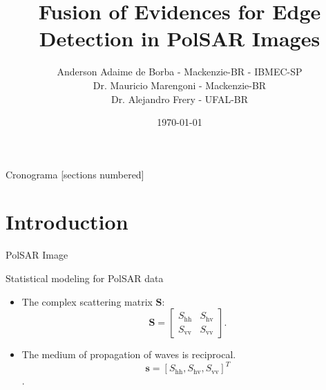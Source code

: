 \documentclass[10pt]{beamer}
\title{Fusion of Evidences for Edge Detection in PolSAR Images}
\date{\today}
\author{Anderson Adaime de Borba - Mackenzie-BR - IBMEC-SP\\
        Dr. Mauricio Marengoni - Mackenzie-BR\\
        Dr. Alejandro Frery - UFAL-BR}
\institute{TENGRSS - 2019}
\begin{document}
\maketitle

\begin{frame}{Cronograma}
  [sections numbered]
  \tableofcontents[hideallsubsections]
\end{frame}

\section{Introduction}

\begin{frame}[fragile]{PolSAR Image}
\begin{alertblock}{Statistical modeling for PolSAR data}
\begin{itemize}
\item The complex scattering matrix $\mathbf{S}$:
\begin{equation}
\mathbf{S} = \left[
\begin{array}{cc}
	S_\text{hh}   & S_\text{hv}   \\
	S_\text{vv}   & S_\text{vv}   
\end{array}
\right].
\end{equation}\label{eq_01}
\item The medium of propagation of waves is reciprocal.
$$\mathbf{s}=[S_\text{hh},S_\text{hv},S_{\text{vv}}]^T$$.
\end{itemize}
\end{alertblock}
\end{frame}
\end{document}
